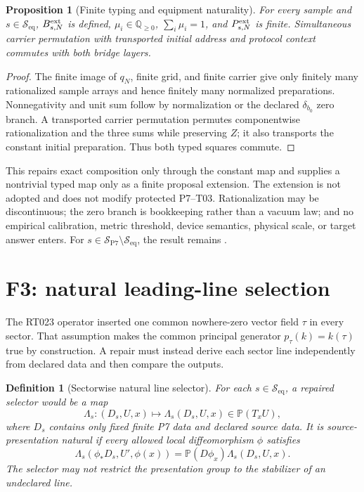 \documentclass[11pt]{article}
\newtheorem{definition}{Definition}
\newtheorem{proposition}{Proposition}
\newcommand{\Seq}{\mathcal S_{\mathrm{eq}}}
\newcommand{\Sall}{\mathcal S_{\mathrm{P7}}}
\newcommand{\QQ}{\mathbb Q}
\newcommand{\PP}{\mathbb P}
\begin{document}
\begin{proposition}[Finite typing and equipment naturality]
For every sample and \(s\in\Seq\), \(B_{s,N}^{\rm ext}\) is defined,
\(\mu_i\in\QQ_{\geq0}\), \(\sum_i\mu_i=1\), and
\(P_{s,N}^{\rm ext}\) is finite.  Simultaneous carrier permutation with
transported initial address and protocol context commutes with both bridge
layers.
\end{proposition}

\begin{proof}
The finite image of \(q_N\), finite grid, and finite carrier give only finitely
many rationalized sample arrays and hence finitely many normalized
preparations.  Nonnegativity and unit sum follow by normalization or the
declared \(\delta_{b_0}\) zero branch.  A transported carrier permutation
permutes componentwise rationalization and the three sums while preserving
\(Z\); it also transports the constant initial preparation.  Thus both typed
squares commute.
\end{proof}

This repairs exact composition only through the constant map and supplies a
nontrivial typed map only as a finite proposal extension.  The extension is not
adopted and does not modify protected P7--T03.  Rationalization may be
discontinuous; the zero branch is bookkeeping rather than a vacuum law; and no
empirical calibration, metric threshold, device semantics, physical scale, or
target answer enters.  For \(s\in\Sall\setminus\Seq\), the result remains
.

\section{F3: natural leading-line selection}

The RT023 operator inserted one common nowhere-zero vector field \(\tau\) in
every sector.  That assumption makes the common principal generator
\(p_\tau(k)=k(\tau)\) true by construction.  A repair must instead derive
each sector line independently from declared data and then compare the
outputs.

\begin{definition}[Sectorwise natural line selector]
For each \(s\in\Seq\), a repaired selector would be a map
\[
 \Lambda_s:(D_s,U,x)\longmapsto
 \Lambda_s(D_s,U,x)\in\PP(T_xU),
\]
where \(D_s\) contains only fixed finite P7 data and declared source data.  It
is source-presentation natural if every allowed local diffeomorphism \(\phi\)
satisfies
\[
 \Lambda_s(\phi_*D_s,U',\phi(x))
 =\PP(D\phi_x)\Lambda_s(D_s,U,x).
\]
The selector may not restrict the presentation group to the stabilizer of an
undeclared line.
\end{definition}
\end{document}
